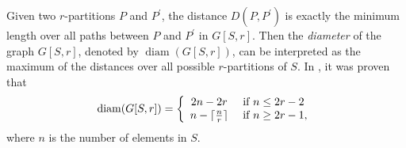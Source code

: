 \documentclass[11pt,a4paper]{article}
\theoremstyle{plain}
\newtheorem{proposition}{Proposition}
\theoremstyle{definition}
\newcommand{\diam}{\operatorname{diam}}
\begin{document}
Given two $r$-partitions $P$ and $P^\prime$, the distance $D(P,P^\prime)$ is exactly the minimum length over all paths between $P$ and $P^\prime$ in $G[S,r]$. Then the \emph{diameter} of the graph $G[S,r]$, denoted by $\diam(G[S,r])$, can be interpreted as the maximum of the distances over all possible $r$-partitions of $S$. In \cite{charon2006maximum}, it was proven that
\[
\diam(G[S,r])= \left\{
\begin{array}{c l}
 2n-2r &  \text{ if } n\leq 2r-2\\
 n-\lceil \frac{n}{r} \rceil & \text{ if }  n\geq 2r-1,
\end{array}
\right.
\]
where $n$ is the number of elements in $S$.






\end{document}
